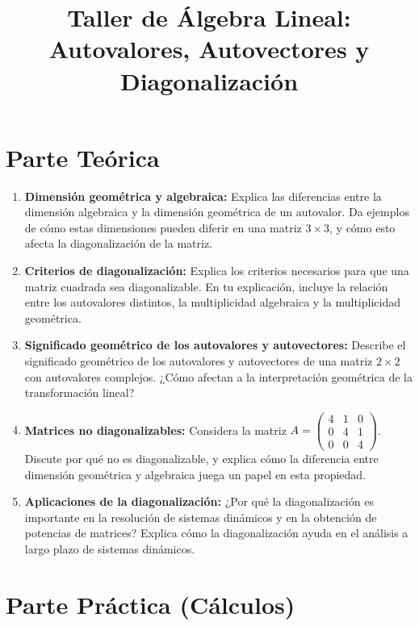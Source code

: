 \documentclass{article}
\title{Taller de Álgebra Lineal: Autovalores, Autovectores y Diagonalización}
\author{ }
\date{}
\begin{document}
\maketitle

\section*{Parte Teórica}

\begin{enumerate}
    \item \textbf{Dimensión geométrica y algebraica:} 
    Explica las diferencias entre la dimensión algebraica y la dimensión geométrica de un autovalor. Da ejemplos de cómo estas dimensiones pueden diferir en una matriz \(3 \times 3\), y cómo esto afecta la diagonalización de la matriz.

    \item \textbf{Criterios de diagonalización:} 
    Explica los criterios necesarios para que una matriz cuadrada sea diagonalizable. En tu explicación, incluye la relación entre los autovalores distintos, la multiplicidad algebraica y la multiplicidad geométrica.

    \item \textbf{Significado geométrico de los autovalores y autovectores:} 
    Describe el significado geométrico de los autovalores y autovectores de una matriz \(2 \times 2\) con autovalores complejos. ¿Cómo afectan a la interpretación geométrica de la transformación lineal?

    \item \textbf{Matrices no diagonalizables:} 
    Considera la matriz \( A = \begin{pmatrix} 4 & 1 & 0 \\ 0 & 4 & 1 \\ 0 & 0 & 4 \end{pmatrix} \). Discute por qué no es diagonalizable, y explica cómo la diferencia entre dimensión geométrica y algebraica juega un papel en esta propiedad.

    \item \textbf{Aplicaciones de la diagonalización:} 
    ¿Por qué la diagonalización es importante en la resolución de sistemas dinámicos y en la obtención de potencias de matrices? Explica cómo la diagonalización ayuda en el análisis a largo plazo de sistemas dinámicos.
\end{enumerate}

\section*{Parte Práctica (Cálculos)}
\end{document}
